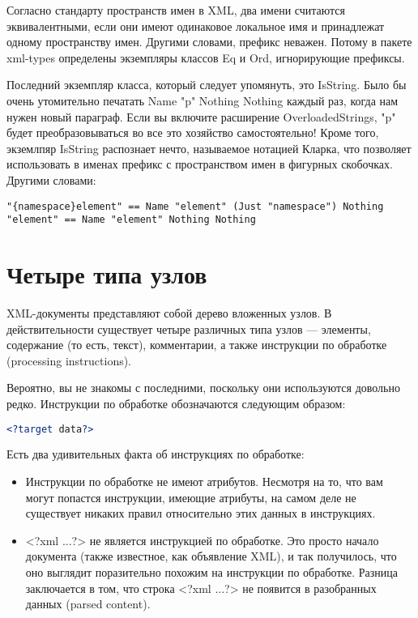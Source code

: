 Согласно стандарту пространств имен в XML, два имени считаются эквивалентными, если они имеют одинаковое локальное имя и принадлежат одному пространству имен. Другими словами, префикс неважен. Потому в пакете xml-types определены экземпляры классов Eq и Ord, игнорирующие префиксы.

Последний экземпляр класса, который следует упомянуть, это IsString. Было бы очень утомительно печатать Name "p" Nothing Nothing каждый раз, когда нам нужен новый параграф. Если вы включите расширение OverloadedStrings, "p" будет преобразовываться во все это хозяйство самостоятельно! Кроме того, экземлпяр IsString распознает нечто, называемое нотацией Кларка, что позволяет использовать в именах префикс с пространством имен в фигурных скобочках. Другими словами:

\begin{lstlisting}
"{namespace}element" == Name "element" (Just "namespace") Nothing
"element" == Name "element" Nothing Nothing
\end{lstlisting}

\section{Четыре типа узлов} %

XML-документы представляют собой дерево вложенных узлов. В действительности существует четыре различных типа узлов --- элементы, содержание (то есть, текст), комментарии, а также инструкции по обработке (processing instructions).

\begin{remark}
Вероятно, вы не знакомы с последними, поскольку они используются довольно редко. Инструкции по обработке обозначаются следующим образом:

\begin{lstlisting}[language=XML]
<?target data?>
\end{lstlisting}

Есть два удивительных факта об инструкциях по обработке:

\begin{itemize}
\item Инструкции по обработке не имеют атрибутов. Несмотря на то, что вам могут попастся инструкции, имеющие атрибуты, на самом деле не существует никаких правил относительно этих данных в инструкциях. %
\item <?xml ...?> не является инструкцией по обработке. Это просто начало документа (также известное, как объявление XML), и так получилось, что оно выглядит поразительно похожим на инструкции по обработке. Разница заключается в том, что строка <?xml ...?> не появится в разобранных данных (parsed content).
\end{itemize}

\end{remark}

